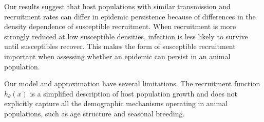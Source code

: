 \documentclass[11pt]{article}
\newcommand{\Rzero}{\mathcal R_0}
\newcommand{\rhoeps}{\rho}
\newcommand{\hth}{h_\theta}
\newcommand{\Cth}{C_\theta}
\begin{document}
%

Our results suggest that host populations with similar transmission and recruitment rates can differ in epidemic persistence because of differences in the density dependence of susceptible recruitment. When recruitment is more strongly reduced at low susceptible densities, infection is less likely to survive until susceptibles recover. This makes the form of susceptible recruitment important when assessing whether an epidemic can persist in an animal population.

Our model and approximation have several limitations. The recruitment function \(\hth(x)\) is a simplified description of host population growth and does not explicitly capture all the demographic mechanisms operating in animal populations, such as age structure and seasonal breeding.
\end{document}
